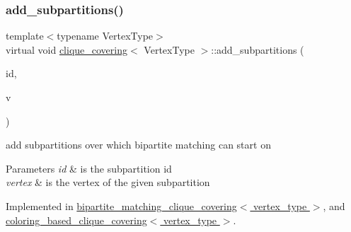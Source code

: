 \mbox{\label{classclique__covering_a5d40053f9ab862b4db09ec41964e0617}} 
\subsubsection{\texorpdfstring{add\+\_\+subpartitions()}{add\_subpartitions()}}
{\footnotesize\ttfamily template$<$typename Vertex\+Type$>$ \\
virtual void \hyperlink{classclique__covering}{clique\+\_\+covering}$<$ Vertex\+Type $>$\+::add\+\_\+subpartitions (\begin{DoxyParamCaption}\item[{\hyperlink{tutorial__fpt__2017_2intro_2sixth_2test_8c_a7c94ea6f8948649f8d181ae55911eeaf}{size\+\_\+t}}]{id,  }\item[{Vertex\+Type}]{v }\end{DoxyParamCaption})\hspace{0.3cm}{\ttfamily [pure virtual]}}



add subpartitions over which bipartite matching can start on 


\begin{DoxyParams}{Parameters}
{\em id} & is the subpartition id \\
\hline
{\em vertex} & is the vertex of the given subpartition \\
\hline
\end{DoxyParams}


Implemented in \hyperlink{classbipartite__matching__clique__covering_a25fd4df6e7216c827c3ff519350bef03}{bipartite\+\_\+matching\+\_\+clique\+\_\+covering$<$ vertex\+\_\+type $>$}, and \hyperlink{classcoloring__based__clique__covering_a4e3275c690b4dfb9ee16e66091beeccf}{coloring\+\_\+based\+\_\+clique\+\_\+covering$<$ vertex\+\_\+type $>$}.

\mbox{\label{classclique__covering_a69a986de5537f3104ee2cea23a88c49d}} 
